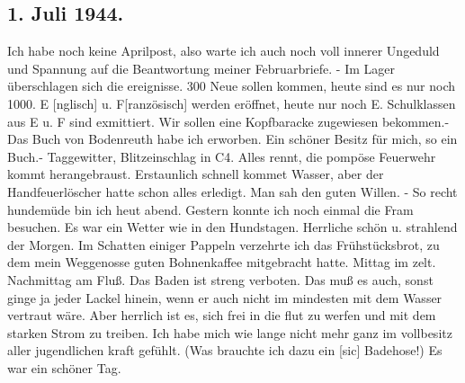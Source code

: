 \subsection{1. Juli 1944.}

Ich habe noch keine Aprilpost, also warte ich auch noch voll innerer Ungeduld und Spannung auf die Beantwortung meiner Februarbriefe.
- Im Lager \"{u}berschlagen sich die ereignisse.
300 Neue sollen kommen, heute sind es nur noch 1000.
E{\color{red} [nglisch] u. F[ranz\"{o}sisch] } werden er\"{o}ffnet, heute nur noch E.
Schulklassen aus E u. F sind exmittiert.
Wir sollen eine Kopfbaracke zugewiesen bekommen.-
Das Buch von Bodenreuth habe ich erworben.
Ein sch\"{o}ner Besitz f\"{u}r mich, so ein Buch.-
Taggewitter, Blitzeinschlag in C4.
Alles rennt, die pomp\"{o}se Feuerwehr kommt herangebraust.
Erstaunlich schnell kommet Wasser, aber der Handfeuerl\"{o}scher hatte schon alles erledigt.
Man sah den guten Willen.
- So recht hundem\"{u}de bin ich heut abend.
Gestern konnte ich noch einmal die Fram besuchen.
Es war ein Wetter wie in den Hundstagen.
Herrliche sch\"{o}n u. strahlend der Morgen.
Im Schatten einiger Pappeln verzehrte ich das Fr\"{u}hst\"{u}cksbrot, zu dem mein Weggenosse guten Bohnenkaffee mitgebracht hatte.
Mittag im zelt.
Nachmittag am Flu{\ss}.
Das Baden ist streng verboten.
Das mu{\ss} es auch, sonst ginge ja jeder Lackel hinein, wenn er auch nicht im mindesten mit dem Wasser vertraut w\"{a}re.
Aber herrlich ist es, sich frei in die flut zu werfen und mit dem starken Strom zu treiben.
Ich habe mich wie lange nicht mehr ganz im vollbesitz aller jugendlichen kraft gef\"{u}hlt.
(Was brauchte ich dazu ein{\color{red} [sic] } Badehose!)
Es war ein sch\"{o}ner Tag.

\clearpage
